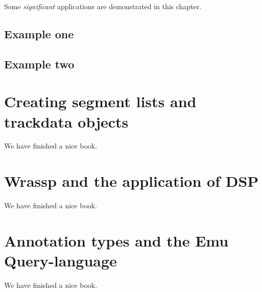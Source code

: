 \documentclass[]{book}
\theoremstyle{definition}
\theoremstyle{definition}
\theoremstyle{definition}
\theoremstyle{remark}
\begin{document}
Some \emph{significant} applications are demonstrated in this chapter.

\section{Example one}\label{example-one}

\section{Example two}\label{example-two}

\chapter{Creating segment lists and trackdata
objects}\label{creating-segment-lists-and-trackdata-objects}

We have finished a nice book.

\chapter{Wrassp and the application of
DSP}\label{wrassp-and-the-application-of-dsp}

We have finished a nice book.

\chapter{Annotation types and the Emu
Query-language}\label{annotation-types-and-the-emu-query-language}

We have finished a nice book.


\end{document}
